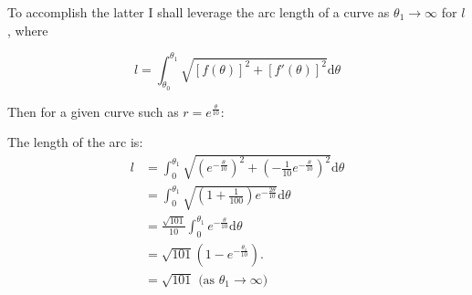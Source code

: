 \documentclass[10pt]{article}
\begin{document}
To accomplish the latter I shall leverage the arc length of a curve as \(\theta_1 \rightarrow \infty\) for \(l\), where

\[ l = \int^{\theta_1}_{\theta_0} \sqrt{[f(\theta)]^2 + [f'(\theta)]^2} \mathrm{d}\theta\]

Then for a given curve such as \(r = e^\frac{\theta}{10}\):
\begin{center} %
\end{center}

The length of the arc is:
\begin{align*}
    l &= \int^{\theta_1}_{0} \sqrt{(e^{-\frac{\theta}{10}})^2 + (-\frac{1}{10}e^{-\frac{\theta}{10}})^2}\mathrm{d}\theta\\
    &= \int^{\theta_1}_{0} \sqrt{(1+\frac{1}{100})e^{-\frac{2\theta}{10}}} \mathrm{d}\theta\\
    &= \frac{\sqrt{101}}{10} \int^{\theta_1}_0 e^{-\frac{\theta}{10}}\mathrm{d}\theta\\
    &= \sqrt{101}(1 - e^{-\frac{\theta_1}{10}}).\\
    &= \sqrt{101} \text{ (as \(\theta_1 \rightarrow \infty\))}
\end{align*}
\end{document}
